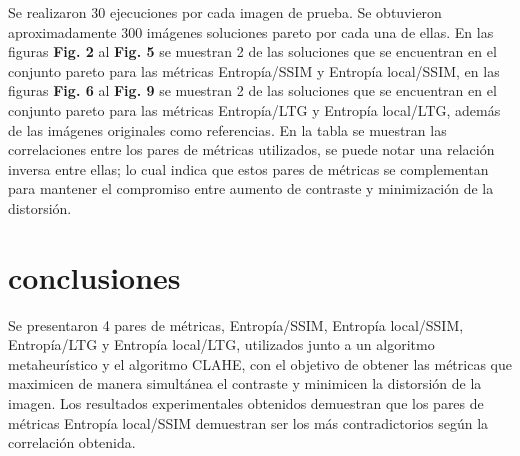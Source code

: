 \documentclass[spanish,twocolumn]{article}
\begin{document}
{ 
Se realizaron 30 ejecuciones por cada imagen de prueba. Se obtuvieron aproximadamente 300 imágenes soluciones pareto por cada una de ellas. En las figuras \textbf {Fig. 2} al \textbf {Fig. 5}  se muestran 2 de las soluciones que se encuentran en el conjunto pareto para las métricas Entropía/SSIM y Entropía local/SSIM, en las figuras \textbf {Fig. 6}  al \textbf {Fig. 9} se muestran 2 de las soluciones que se encuentran en el conjunto pareto para las métricas Entropía/LTG y Entropía local/LTG, además de las imágenes originales como referencias. En la tabla se muestran las correlaciones entre los pares de métricas utilizados, se puede notar una relación inversa entre ellas; lo cual indica que estos pares de métricas se complementan para mantener el compromiso entre aumento de contraste y minimización de la distorsión. 

\section{conclusiones}
\label{sec:conclusion}
Se presentaron 4 pares de métricas, Entropía/SSIM, Entropía local/SSIM, Entropía/LTG y Entropía local/LTG, utilizados junto a un algoritmo metaheurístico y el algoritmo CLAHE, con el objetivo de obtener las métricas que maximicen de manera simultánea el contraste y minimicen la distorsión de la imagen. Los resultados experimentales obtenidos demuestran que los pares de métricas Entropía local/SSIM demuestran ser los más contradictorios según la correlación obtenida.


\onecolumn
\noindent\begin{minipage}[b]{1.0\linewidth}
  \centering
   

\end{minipage}}
\end{document}
